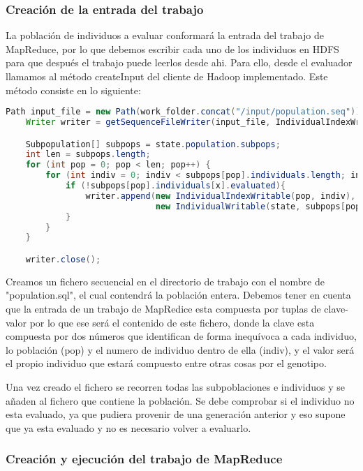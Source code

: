 \subsubsection{Creación de la entrada del trabajo}

La población de individuos a evaluar conformar\'a la entrada del trabajo de MapReduce, por lo que debemos escribir cada uno de los individuos en HDFS para que después el trabajo puede leerlos desde ahi. Para ello, desde el evaluador llamamos al método createInput del cliente de Hadoop implementado. Este método consiste en lo siguiente:

\begin{lstlisting}[language=Java]
	Path input_file = new Path(work_folder.concat("/input/population.seq"));
	Writer writer = getSequenceFileWriter(input_file, IndividualIndexWritable.class, IndividualWritable.class);

	Subpopulation[] subpops = state.population.subpops;
	int len = subpops.length;
	for (int pop = 0; pop < len; pop++) {
		for (int indiv = 0; indiv < subpops[pop].individuals.length; indiv++) {
			if (!subpops[pop].individuals[x].evaluated){
				writer.append(new IndividualIndexWritable(pop, indiv), 
						      new IndividualWritable(state, subpops[pop].individuals[indiv]));
			}
		}
	}

	writer.close();
\end{lstlisting}

Creamos un fichero secuencial en el directorio de trabajo con el nombre de "population.sql", el cual contendrá la población entera. Debemos tener en cuenta que la entrada de un trabajo de MapRedice esta compuesta por tuplas de clave-valor por lo que ese ser\'a el contenido de este fichero, donde la clave esta compuesta por dos números que identifican de forma inequívoca a cada individuo, lo población (pop) y el numero de individuo dentro de ella (indiv), y el valor ser\'a el propio individuo que estará compuesto entre otras cosas por el genotipo.

Una vez creado el fichero se recorren todas las subpoblaciones e individuos y se a\~naden al fichero que contiene la población. Se debe comprobar si el individuo no esta evaluado, ya que pudiera provenir de una generación anterior y eso supone que ya esta evaluado y no es necesario volver a evaluarlo.

\subsubsection{Creación y ejecución del trabajo de MapReduce}

